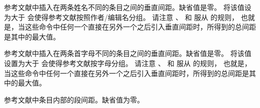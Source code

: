 \begin{ltxsyntax}


参考文献中插入在两条姓名不同的条目之间的垂直间距。缺省值是零。
将该值设为大于  会使得参考文献按照作者/编辑名分组。
请注意 、 和  服从  的规则，
也就是，当这些命令中任何一个直接在另外一个之后引入垂直间距时，所得到的总间距是其中的最大值。



参考文献中插入在两条首字母不同的条目之间的垂直间距。缺省值是零。
将该值设置为大于  会使得参考文献按字母分组。
请注意 、 和  服从  的规则，
也就是，当这些命令中任何一个直接在另外一个之后引入垂直间距时，所得到的总间距是其中的最大值。



参考文献中条目内部的段间距。缺省值为零。



\end{ltxsyntax}
